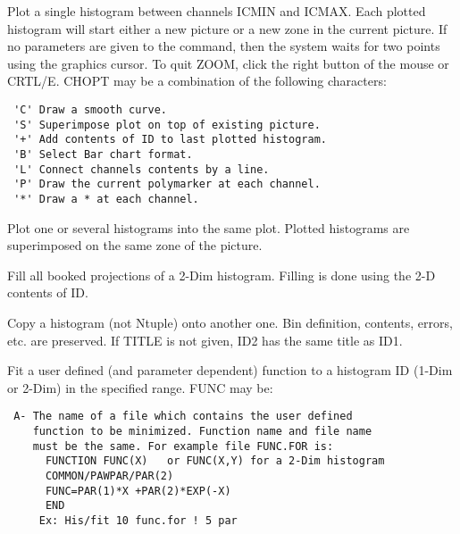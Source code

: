 \BEGARG
{}
\ENDARG
\BEGTEXT
Plot a single histogram between channels ICMIN and ICMAX.
Each plotted histogram will start
either a new picture or a new zone in the current picture.
If no parameters are given to the command, then the system waits
for two points using the graphics cursor. To quit ZOOM, click
the right button of the mouse or CRTL/E.
CHOPT may be a combination of the following characters:
\begin{verbatim}
 'C' Draw a smooth curve.
 'S' Superimpose plot on top of existing picture.
 '+' Add contents of ID to last plotted histogram.
 'B' Select Bar chart format.
 'L' Connect channels contents by a line.
 'P' Draw the current polymarker at each channel.
 '*' Draw a * at each channel.
\end{verbatim}
\ENDTEXT

\BEGARG
{}
\ENDARG
\BEGTEXT
Plot one or several histograms into the same plot.
Plotted histograms are superimposed on the same zone
of the picture.
\ENDTEXT

\BEGARG
{}
\ENDARG
\BEGTEXT
Fill all booked projections of a 2-Dim histogram.
Filling is done using the 2-D contents of ID.
\ENDTEXT

\BEGARG
{}
\ENDARG
\BEGTEXT
Copy a histogram (not Ntuple) onto another one.
Bin definition, contents, errors, etc. are preserved.
If TITLE is not given, ID2 has the same title as ID1.
\ENDTEXT

\BEGARG
{}
\ENDARG
\BEGTEXT
Fit a user defined (and parameter dependent) function
to a histogram ID (1-Dim or 2-Dim) in the specified range.
FUNC may be:
\begin{verbatim}
 A- The name of a file which contains the user defined
    function to be minimized. Function name and file name
    must be the same. For example file FUNC.FOR is:
      FUNCTION FUNC(X)   or FUNC(X,Y) for a 2-Dim histogram
      COMMON/PAWPAR/PAR(2)
      FUNC=PAR(1)*X +PAR(2)*EXP(-X)
      END
     Ex: His/fit 10 func.for ! 5 par
\end{verbatim}

